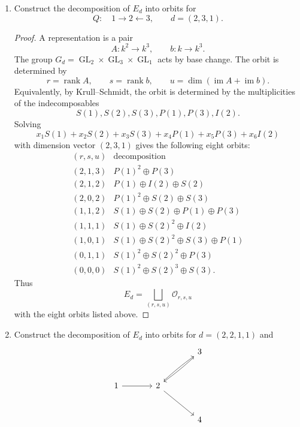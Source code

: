 \documentclass[11pt, a4paper]{article}
\newcommand{\im}{\operatorname{im}}
\begin{document}
\begin{enumerate}[leftmargin=*, label=\textbf{\arabic*.}]
\item Construct the decomposition of $E_d$ into orbits for
\[
Q:\quad 1\longrightarrow 2\longleftarrow 3,
\qquad d=(2,3,1).
\]

\begin{proof}
A representation is a pair
\[
A:k^2\to k^3,
\qquad b:k\to k^3.
\]
The group $G_d=\operatorname{GL}_2\times\operatorname{GL}_3\times\operatorname{GL}_1$ acts by base change. The orbit is determined by
\[
r=\operatorname{rank}A,
\qquad
s=\operatorname{rank}b,
\qquad
u=\dim(\im A+\im b).
\]
Equivalently, by Krull--Schmidt, the orbit is determined by the multiplicities of the indecomposables
\[
S(1),S(2),S(3),P(1),P(3),I(2).
\]
Solving
\[
x_1S(1)+x_2S(2)+x_3S(3)+x_4P(1)+x_5P(3)+x_6I(2)
\]
with dimension vector $(2,3,1)$ gives the following eight orbits:
\[
\begin{array}{c|c}
(r,s,u)&\text{decomposition}\\ \hline
(2,1,3)&P(1)^2\oplus P(3)\\
(2,1,2)&P(1)\oplus I(2)\oplus S(2)\\
(2,0,2)&P(1)^2\oplus S(2)\oplus S(3)\\
(1,1,2)&S(1)\oplus S(2)\oplus P(1)\oplus P(3)\\
(1,1,1)&S(1)\oplus S(2)^2\oplus I(2)\\
(1,0,1)&S(1)\oplus S(2)^2\oplus S(3)\oplus P(1)\\
(0,1,1)&S(1)^2\oplus S(2)^2\oplus P(3)\\
(0,0,0)&S(1)^2\oplus S(2)^3\oplus S(3).
\end{array}
\]
Thus
\[
E_d=\bigsqcup_{(r,s,u)}\mathcal O_{r,s,u}
\]
with the eight orbits listed above.
\end{proof}

\item Construct the decomposition of $E_d$ into orbits for $d=(2,2,1,1)$ and
\[
\begin{tikzcd}[column sep=large,row sep=large]
&&3\arrow[dl,bend left=.7ex]\\
1\arrow[r]&2\arrow[ur,bend left=.7ex]\arrow[dr]&\\
&&4
\end{tikzcd}
\]


\end{enumerate}
\end{document}
